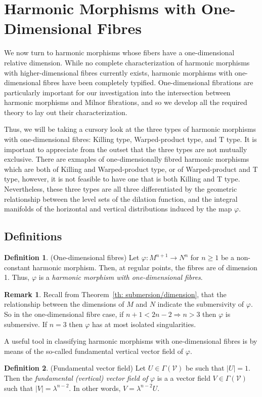 \documentclass[12pt]{article}
\theoremstyle{definition}
\newtheorem{definition}{Definition}[section]
\newtheorem{remark}{Remark}[subsection]
\numberwithin{equation}{subsection}
\begin{document}
\section{Harmonic Morphisms with One-Dimensional Fibres}
We now turn to harmonic morphisms whose fibers have a one-dimensional relative dimension. While no complete characterization of harmonic morphisms with higher-dimensional fibres currently exists, harmonic morphisms with one-dimensional fibres have been completely typified. One-dimensional fibrations are particularly important for our investigation into the intersection between harmonic morphisms and Milnor fibrations, and so we develop all the required theory to lay out their characterization.

Thus, we will be taking a cursory look at the three types of harmonic morphisms with one-dimensional fibres: Killing type, Warped-product type, and T type. It is important to appreciate from the outset that the three types are not mutually exclusive. There are exmaples of one-dimensionally fibred harmonic morphisms which are both of Killing and Warped-product type, or of Warped-product and T type, however, it is not feasible to have one that is both Killing and T type. Nevertheless, these three types are all three differentiated by the geometric relationship between the level sets of the dilation function, and the integral manifolds of the horizontal and vertical distributions induced by the map $\varphi$. 
\subsection{Definitions}
\begin{definition} (One-dimensional fibres)
Let $\varphi: M^{n+1} \rightarrow N^n$ for $n \geq 1$ be a non-constant harmonic morphism. Then, at regular points, the fibres are of dimension 1. Thus, $\varphi$ is a \textit{harmonic morphism with one-dimensional fibres}. 
\end{definition}
\begin{remark}
 Recall from Theorem~\ref{th: submersion/dimension}, that the relationship between the dimensions of $M$ and $N$ indicate the submersivity of $\varphi$. So in the one-dimensional fibre case, if  $n+1 < 2n -2 \Rightarrow n>3$ then $\varphi$ is submersive. If $n=3$ then $\varphi$ has at most isolated singularities. 
\end{remark}

A useful tool in classifying harmonic morphisms with one-dimensional fibres is by means of the so-called fundamental vertical vector field of $\varphi$.
\begin{definition} (Fundamental vector field) Let $U \in \Gamma(\mathcal{V})$ be such that $|U| = 1$. Then the \textit{fundamental (vertical) vector field of} $\varphi$ is a a vector field $V \in \Gamma(\mathcal{V})$ such that $|V| = \lambda^{n-2}$. In other words, $V = \lambda^{n-2} U$.

\end{definition}
\end{document}
